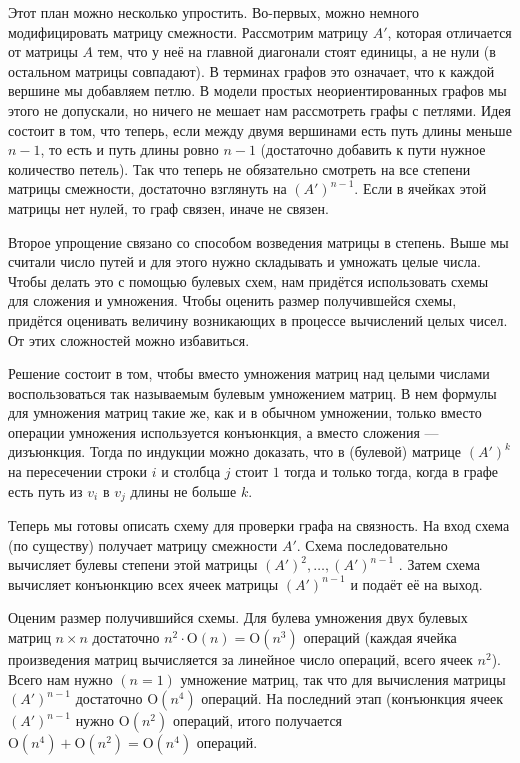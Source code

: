 \documentclass[a4paper]{article}
\theoremstyle{named}
\renewcommand{\O}{\text{O}}
\begin{document}
\begin{colloq}
\begin{solution}
            Этот план можно несколько упростить. Во-первых, можно немного модифицировать матрицу смежности. Рассмотрим матрицу $A'$, которая отличается от матрицы $A$ тем, что у неё на главной диагонали стоят единицы, а не нули (в остальном матрицы совпадают). В терминах графов это означает, что к каждой вершине мы добавляем петлю. В модели простых неориентированных графов мы этого не допускали, но ничего не мешает нам рассмотреть графы с петлями. Идея состоит в том, что теперь, если между двумя вершинами есть путь длины меньше $n - 1$, то есть и путь длины ровно $n - 1$ (достаточно добавить к пути нужное количество петель). Так что теперь не обязательно смотреть на все степени матрицы смежности, достаточно взглянуть на $(A')^{n - 1}$. Если в ячейках этой матрицы нет нулей, то граф связен, иначе не связен.
            
            Второе упрощение связано со способом возведения матрицы в степень. Выше мы считали число путей и для этого нужно складывать и умножать целые числа. Чтобы делать это с помощью булевых схем, нам придётся использовать схемы для сложения и умножения. Чтобы оценить размер получившейся схемы, придётся оценивать величину возникающих в процессе вычислений целых чисел. От этих сложностей можно избавиться.

            Решение состоит в том, чтобы вместо умножения матриц над целыми числами воспользоваться так называемым булевым умножением матриц. В нем формулы для умножения матриц такие же, как и в обычном умножении, только вместо операции умножения используется конъюнкция, а вместо сложения --- дизъюнкция. Тогда по индукции можно доказать, что в (булевой) матрице $(A')^k$ на пересечении строки $i$ и столбца $j$ стоит $1$ тогда и только тогда, когда в графе есть путь из $v_i$ в $v_j$ длины не больше $k$.

            Теперь мы готовы описать схему для проверки графа на связность. На вход схема (по существу) получает матрицу смежности $A'$. Схема последовательно вычисляет булевы степени этой матрицы $(A')^2, \dots, (A')^{n - 1}$ . Затем схема вычисляет конъюнкцию всех ячеек матрицы $(A')^{n - 1}$ и подаёт её на выход.

            Оценим размер получившийся схемы. Для булева умножения двух булевых матриц $n \times n$ достаточно $n^2 \cdot \O(n) = \O(n^3)$ операций (каждая ячейка произведения матриц вычисляется за линейное число операций, всего ячеек $n^2$). Всего нам нужно $(n = 1)$ умножение матриц, так что для вычисления матрицы $(A')^{n - 1}$ достаточно $\O(n^4)$ операций. На последний этап (конъюнкция ячеек $(A')^{n - 1}$ нужно $\O(n^2)$ операций, итого получается $\O(n^4) + \O(n^2) = \O(n^4)$ операций.
        \end{solution}


\end{colloq}
\end{document}
